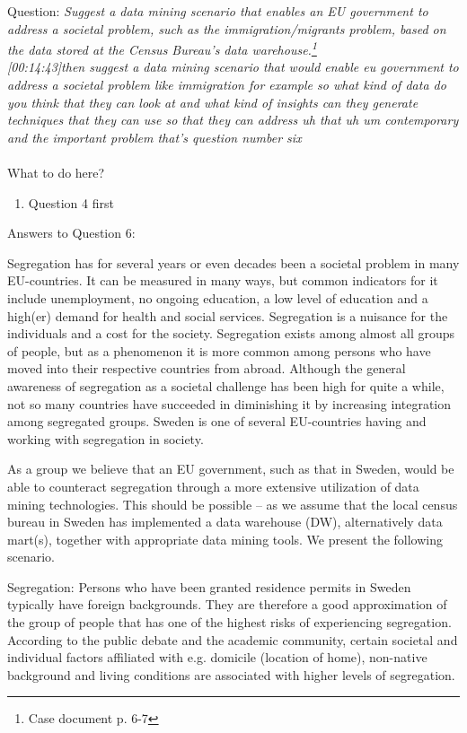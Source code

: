 Question:
\emph{
    Suggest a data mining scenario that enables an EU government to address a societal
problem, such as the immigration/migrants problem, based on the data stored at the
Census Bureau’s data warehouse.\footnote{Case document p. 6-7}
}\\

\emph{[00:14:43]then suggest a data mining scenario that would enable eu government
to address a societal problem like immigration for example so what kind of data do you think
that they can look at and what kind of insights can they generate techniques that they can use
so that they can address uh that uh um contemporary and the important problem that's question number
six}\\\\

What to do here?
\begin{enumerate}
    \item Question 4 first
  \end{enumerate}

\newpage Answers to Question 6:

Segregation has for several years or even decades been a societal problem in many EU-countries. 
It can be measured in many ways, but common indicators for it include unemployment, no ongoing education, 
a low level of education and a high(er) demand for health and social services. 
Segregation is a nuisance for the individuals and a cost for the society. 
Segregation exists among almost all groups of people, 
but as a phenomenon it is more common among persons who have moved into their respective countries from abroad. 
Although the general awareness of segregation as a societal challenge has been high for quite a while, 
not so many countries have succeeded in diminishing it by increasing integration among segregated groups. 
Sweden is one of several EU-countries having and working with segregation in society.  

As a group we believe that an EU government, 
such as that in Sweden, would be able to counteract segregation through a more extensive utilization of data mining technologies. 
This should be possible – as we assume that the local census bureau in Sweden has implemented a data warehouse (DW), 
alternatively data mart(s), together with appropriate data mining tools. 
We present the following scenario. 

Segregation: Persons who have been granted residence permits in Sweden typically have foreign backgrounds. 
They are therefore a good approximation of the group of people that has one of the highest risks of experiencing segregation. 
According to the public debate and the academic community, 
certain societal and individual factors affiliated with e.g. domicile (location of home), 
non-native background and living conditions are associated with higher levels of segregation.  

